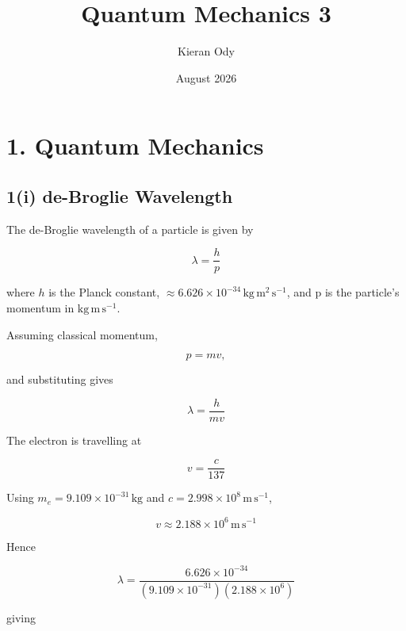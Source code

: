 \documentclass{article}
\title{Quantum Mechanics 3}
\author{Kieran Ody}
\date{August 2026}
\begin{document}
\maketitle

\section*{1. Quantum Mechanics}

\subsection*{1(i) de-Broglie Wavelength}

The de-Broglie wavelength of a particle is given by

\begin{equation*}
\lambda=\frac{h}{p}
\end{equation*}

where $h$ is the Planck constant, $\approx 6.626 \times 10^{-34} \, \mathrm{kg\,m^{2}\,s^{-1}}$, and p is the particle's momentum in $\mathrm{kg\,m\,s^{-1}}$.

\vspace{1\baselineskip}

Assuming classical momentum,

\begin{equation*}
p=mv,
\end{equation*}

and substituting gives

\begin{equation*}
\lambda=\frac{h}{mv}
\end{equation*}

The electron is travelling at

\begin{equation*}
v=\frac{c}{137}
\end{equation*}

Using $m_e=9.109 \times 10^{-31}\,\mathrm{kg}$ and $c=2.998 \times 10^8\,\mathrm{m\,s^{-1}}$,

\begin{equation*}
v \approx 2.188\times10^6\,\mathrm{m\,s^{-1}}
\end{equation*}

Hence

\begin{equation*}
\lambda = \frac{6.626\times10^{-34}}{(9.109\times10^{-31})(2.188\times10^6)}
\end{equation*}

giving
\end{document}
